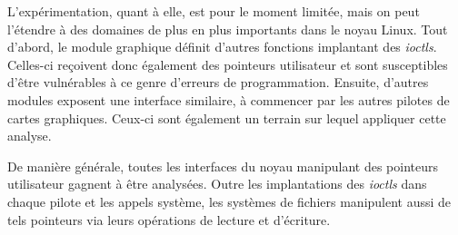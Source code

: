 L'expérimentation, quant à elle, est pour le moment limitée, mais on peut
l'étendre à des domaines de plus en plus importants dans le noyau Linux. Tout
d'abord, le module graphique définit d'autres fonctions implantant des
\emph{ioctls}. Celles-ci reçoivent donc également des pointeurs utilisateur et
sont susceptibles d'être vulnérables à ce genre d'erreurs de programmation.
Ensuite, d'autres modules exposent une interface similaire, à commencer par les
autres pilotes de cartes graphiques. Ceux-ci sont également un terrain sur
lequel appliquer cette analyse.

De manière générale, toutes les interfaces du noyau manipulant des pointeurs
utilisateur gagnent à être analysées. Outre les implantations des \emph{ioctls}
dans chaque pilote et les appels système, les systèmes de fichiers manipulent
aussi de tels pointeurs via leurs opérations de lecture et d'écriture.

